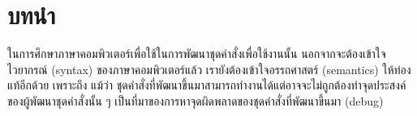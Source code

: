 \chapter{บทนำ}
%
\par{
ในการศึกษาภาษาคอมพิวเตอร์เพื่อใช้ในการพัฒนาชุดคำสั่งเพื่อใช้งานนั้น
นอกจากจะต้องเข้าใจไวยากรณ์ (syntax) ของภาษาคอมพิวเตอร์แล้ว 
เรายังต้องเข้าใจอรรถศาสตร์ (semantics) ให้ท่องแท้อีกด้วย เพราะถึง
แม้ว่า ชุดคำสั่งที่พัฒนาขึ้นมาสามารถทำงานได้แต่อาจจะไม่ถูกต้องทำจุดประสงค์
ของผู้พัฒนาชุดคำสั่งนั้น ๆ เป็นที่มาของการหาจุดผิดพลาดของชุดคำสั่งที่พัฒนาขึ้นมา (debug)
}
